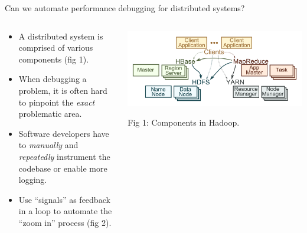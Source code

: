 \begin{frame}{Can we automate performance debugging for distributed systems?}
  \begin{columns}[T]
    \begin{column}{.55\textwidth}
      {
      \small
      \begin{itemize}
        \item A distributed system is comprised of various components (fig 1).
        \item When debugging a problem, it is often hard to pinpoint the \textit{exact}
        problematic area.
          \item Software developers have to \textit{manually} and \textit{repeatedly} instrument the codebase or
          enable more logging.
        \item Use ``signals'' as feedback in a loop to automate the ``zoom in'' process (fig 2).
      \end{itemize}
      }
    \end{column}
    \begin{column}{.4\textwidth}

      \includegraphics[width=.9\textwidth]{figures/dist-sys.png}

      {\tiny Fig 1: Components in Hadoop. }


\end{column}
\end{columns}
\end{frame}

